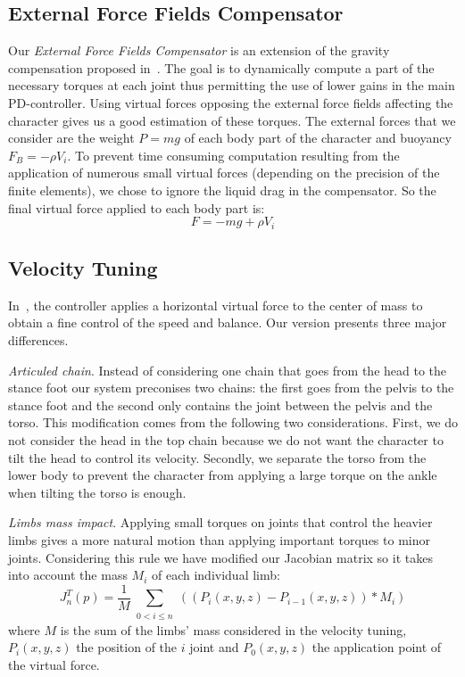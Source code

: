 \documentclass[runningheads,a4paper,10pt]{llncs}
\begin{document}
\subsection{External Force Fields Compensator}
\label{sec:ext_force_comp}

Our \textit{External Force Fields Compensator} is an extension of the gravity compensation proposed in~\citep{coros2010generalized}. The goal is to dynamically compute a part of the necessary torques at each joint thus permitting the use of lower gains in the main PD-controller. Using virtual forces opposing the external force fields affecting the character gives us a good estimation of these torques. The external forces that we consider are the weight $P=mg$ of each body part of the character and buoyancy $F_B=-\rho V_i$.
To prevent time consuming computation resulting from the application of numerous small virtual forces (depending on the precision of the finite elements), we chose to ignore the liquid drag in the compensator.
 So the final virtual force applied to each body part is:
$$
F=-mg+\rho V_i
$$



\subsection{Velocity Tuning}
\label{sec:speed_virt_force}




In~\citep{coros2010generalized}, the controller applies a horizontal virtual force to the center of mass to obtain a fine control of the speed and balance. Our version presents three major differences. 


\textit{Articuled chain}. Instead of considering one chain that goes from the head to the stance foot our system preconises two chains: the first goes from the pelvis to the stance foot and the second only contains the joint between the pelvis and the torso.
This modification comes from the following two considerations. First, we do not consider the head in the top chain because we do not want the character to tilt the head to control its velocity. Secondly, we separate the torso from the lower body to prevent the character from applying a large torque on the ankle when tilting the torso is enough. 

\textit{Limbs mass impact}. Applying small torques on joints that control the heavier limbs gives a more natural motion than applying important torques to minor joints. Considering this rule we have modified our Jacobian matrix so it takes into account the mass $M_i$ of each individual limb:
$$
J_n ^T (p)=\frac{1}{M}\sum_{\substack{0<i\leq n}} ((P_i(x,y,z)-P_{i-1}(x,y,z))*M_i)
$$
where $M$ is the sum of the limbs' mass considered in the velocity tuning, $P_i(x,y,z)$ the position of the $i$ joint and $P_0(x,y,z)$ the application point of the virtual force. 
\end{document}
